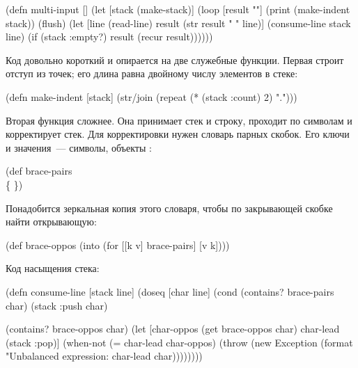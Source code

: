 \begin{english}
  \begin{clojure}
(defn multi-input []
  (let [stack (make-stack)]
    (loop [result ""]
      (print (make-indent stack))
      (flush)
      (let [line (read-line)
            result (str result " " line)]
        (consume-line stack line)
        (if (stack :empty?)
          result
          (recur result))))))
  \end{clojure}
\end{english}

Код довольно короткий и опирается на две служебные функции. Первая  строит отступ из точек; его длина равна двойному числу элементов в стеке:

\begin{english}
  \begin{clojure}
(defn make-indent [stack]
  (str/join (repeat (* (stack :count) 2) ".")))
  \end{clojure}
\end{english}

Вторая функция  сложнее. Она принимает стек и строку, проходит по символам и корректирует стек. Для корректировки нужен словарь парных скобок. Его ключи и значения~--- символы, объекты :

\begin{english}
  \begin{clojure}
(def brace-pairs
  {\( \)
   \[ \]
   \{ \}})
  \end{clojure}
\end{english}

Понадобится зеркальная копия этого словаря, чтобы по закрывающей скобке найти открывающую:

\begin{english}
  \begin{clojure}
(def brace-oppos
  (into {} (for [[k v] brace-pairs]
             [v k])))
  \end{clojure}
\end{english}

Код насыщения стека:

\begin{english}
  \begin{clojure/lines}
(defn consume-line [stack line]
  (doseq [char line]
    (cond
      (contains? brace-pairs char)
      (stack :push char)

      (contains? brace-oppos char)
      (let [char-oppos
            (get brace-oppos char)
            char-lead
            (stack :pop)]
        (when-not (= char-lead char-oppos)
          (throw
           (new Exception
                (format "Unbalanced expression: %
                        char-lead char))))))))
  \end{clojure/lines}
\end{english}

